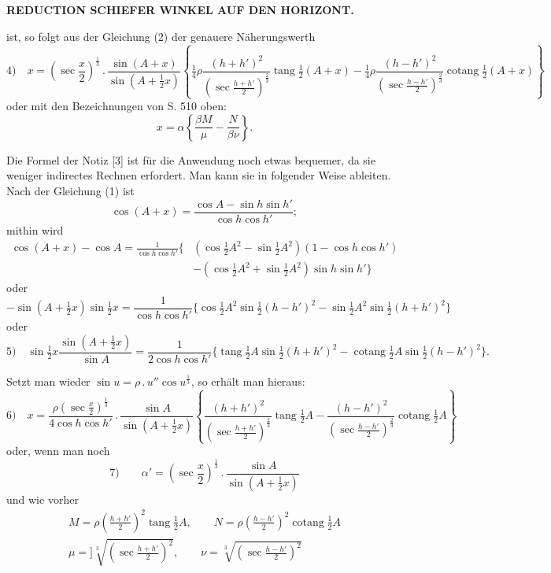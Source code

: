 \par\clearpage
\noindent\null\hfill{\small\textbf{REDUCTION SCHIEFER WINKEL AUF DEN HORIZONT.}}\hfill{}\par\medskip
\begingroup\small
\noindent ist, so folgt aus der Gleichung (2) der genauere Näherungswerth
\[
\text{4)}\quad x=\left(\sec\frac x2\right)^{\frac13}\,.\,\frac{\sin(A+x)}{\sin(A+\frac12x)}
\left\{\tfrac14\rho\frac{(h+h')^2}{\left(\sec\frac{h+h'}2\right)^{\frac23}}\operatorname{tang}\tfrac12(A+x)
-\tfrac14\rho\frac{(h-h')^2}{\left(\sec\frac{h-h'}2\right)^{\frac23}}\operatorname{cotang}\tfrac12(A+x)\right\}
\]
\noindent oder mit den Bezeichnungen von S. 510 oben:
\[
x=\alpha\left\{\frac{\beta M}{\mu}-\frac N{\beta\nu}\right\}.
\]
\par\bigskip\noindent\hspace*{\parindent}Die Formel der Notiz [3] ist für die Anwendung noch etwas bequemer, da sie weniger indirectes Rechnen erfordert. Man kann sie in folgender Weise ableiten. Nach der Gleichung (1) ist
\[
\cos(A+x)=\frac{\cos A-\sin h\sin h'}{\cos h\cos h'};
\]
\noindent mithin wird
\[
\begin{aligned}
\cos(A+x)-\cos A=\frac1{\cos h\cos h'}\bigl\{&(\cos\tfrac12A^2-\sin\tfrac12A^2)(1-\cos h\cos h')\\
&-(\cos\tfrac12A^2+\sin\tfrac12A^2)\sin h\sin h'\bigr\}
\end{aligned}
\]
\noindent oder
\[
-\sin(A+\tfrac12x)\sin\tfrac12x=\frac1{\cos h\cos h'}\{\cos\tfrac12A^2\sin\tfrac12(h-h')^2-\sin\tfrac12A^2\sin\tfrac12(h+h')^2\}
\]
\noindent oder
\[
\text{5)}\quad\sin\tfrac12x\frac{\sin(A+\frac12x)}{\sin A}
=\frac1{2\cos h\cos h'}\{\operatorname{tang}\tfrac12A\sin\tfrac12(h+h')^2-\operatorname{cotang}\tfrac12A\sin\tfrac12(h-h')^2\}.
\]
\par\noindent\hspace*{\parindent}Setzt man wieder $\sin u=\rho\,.\,u''\cos u^{\frac13}$, so erhält man hieraus:
\[
\text{6)}\quad x=\frac{\rho\left(\sec\frac x2\right)^{\frac13}}{4\cos h\cos h'}\,.\,\frac{\sin A}{\sin(A+\frac12x)}
\left\{\frac{(h+h')^2}{\left(\sec\frac{h+h'}2\right)^{\frac23}}\operatorname{tang}\tfrac12A
-\frac{(h-h')^2}{\left(\sec\frac{h-h'}2\right)^{\frac23}}\operatorname{cotang}\tfrac12A\right\}
\]
\noindent oder, wenn man noch
\[
\text{7)}\qquad\alpha'=\left(\sec\frac x2\right)^{\frac13}\,.\,\frac{\sin A}{\sin(A+\frac12x)}
\]
\noindent und wie vorher
\[
\begin{gathered}
M=\rho\left(\frac{h+h'}2\right)^2\operatorname{tang}\tfrac12A,\qquad N=\rho\left(\frac{h-h'}2\right)^2\operatorname{cotang}\tfrac12A\\
\mu=]\sqrt[3]{\left(\sec\frac{h+h'}2\right)^2},\qquad\nu=\sqrt[3]{\left(\sec\frac{h-h'}2\right)^2}
\end{gathered}
\]
